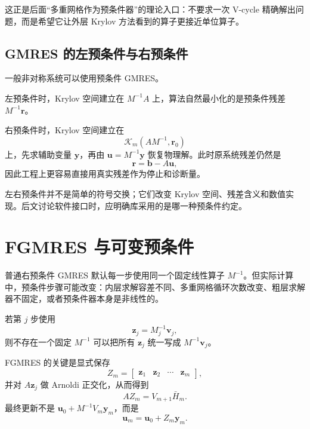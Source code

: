 这正是后面“多重网格作为预条件器”的理论入口：不要求一次 V-cycle 精确解出问题，而是希望它让外层 Krylov 方法看到的算子更接近单位算子。

\subsection{GMRES 的左预条件与右预条件}

一般非对称系统可以使用预条件 GMRES。

左预条件时，Krylov 空间建立在 $M^{-1}A$ 上，算法自然最小化的是预条件残差 $M^{-1}\bm r$。

右预条件时，Krylov 空间建立在
\begin{equation}
\mathcal K_m(AM^{-1},\bm r_0)
\end{equation}
上，先求辅助变量 $\bm y$，再由 $\bm u=M^{-1}\bm y$ 恢复物理解。此时原系统残差仍然是
\begin{equation}
\bm r=\bm b-A\bm u,
\end{equation}
因此工程上更容易直接用真实残差作为停止和诊断量。

左右预条件并不是简单的符号交换；它们改变 Krylov 空间、残差含义和数值实现。后文讨论软件接口时，应明确库采用的是哪一种预条件约定。

\section{FGMRES 与可变预条件}
\label{sec:fgmres}

普通右预条件 GMRES 默认每一步使用同一个固定线性算子 $M^{-1}$。但实际计算中，预条件步骤可能改变：内层求解容差不同、多重网格循环次数改变、粗层求解器不固定，或者预条件器本身是非线性的。

若第 $j$ 步使用
\begin{equation}
\bm z_j=M_j^{-1}\bm v_j,
\label{eq:fgmres-variable-preconditioner}
\end{equation}
则不存在一个固定 $M^{-1}$ 可以把所有 $\bm z_j$ 统一写成 $M^{-1}\bm v_j$。

FGMRES 的关键是显式保存
\begin{equation}
Z_m
=
\begin{bmatrix}
\bm z_1&\bm z_2&\cdots&\bm z_m
\end{bmatrix},
\end{equation}
并对 $A\bm z_j$ 做 Arnoldi 正交化，从而得到
\begin{equation}
\boxed{
AZ_m
=
V_{m+1}\bar H_m.
}
\label{eq:fgmres-arnoldi}
\end{equation}
最终更新不是 $\bm u_0+M^{-1}V_m\bm y_m$，而是
\begin{equation}
\boxed{
\bm u_m
=
\bm u_0+Z_m\bm y_m.
}
\label{eq:fgmres-update}
\end{equation}

